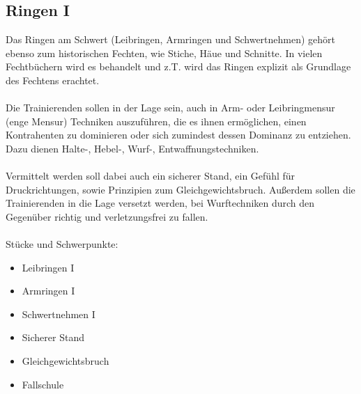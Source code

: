 \newpage

\begin{center}
\end{center}

\newpage

\subsection{Ringen I}
\label{sec:ringen1}

Das Ringen am Schwert (Leibringen, Armringen und Schwertnehmen) gehört ebenso zum historischen Fechten, wie Stiche, Häue und Schnitte.
In vielen Fechtbüchern wird es behandelt und z.T. wird das Ringen explizit als Grundlage des Fechtens erachtet.
\\
\\
Die Trainierenden sollen in der Lage sein, auch in Arm- oder Leibringmensur (enge Mensur) Techniken auszuführen, die es ihnen ermöglichen, einen Kontrahenten zu dominieren oder sich zumindest dessen Dominanz zu entziehen.
Dazu dienen Halte-, Hebel-, Wurf-, Entwaffnungstechniken.
\\
\\
Vermittelt werden soll dabei auch ein sicherer Stand, ein Gefühl für Druckrichtungen, sowie Prinzipien zum Gleichgewichtsbruch.
Außerdem sollen die Trainierenden in die Lage versetzt werden, bei Wurftechniken durch den Gegenüber richtig und verletzungsfrei zu fallen.
\\
\\
Stücke und Schwerpunkte:

\begin{itemize}
    \item Leibringen I
    \item Armringen I
    \item Schwertnehmen I
\end{itemize}

\hspace{0.5cm}

\begin{itemize}
    \item Sicherer Stand
    \item Gleichgewichtsbruch
    \item Fallschule
\end{itemize}

\newpage

\null
\thispagestyle{empty}

\newpage

